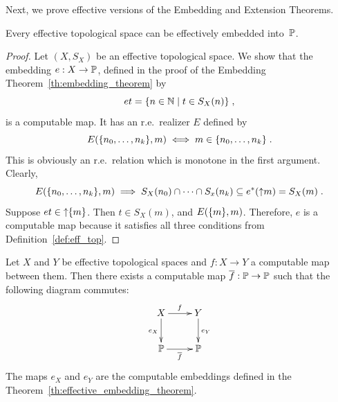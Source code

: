 Next, we prove effective versions of the Embedding and Extension
Theorems.

\begin{theorem}
  \label{th:effective_embedding_theorem}%
  Every effective topological space can be effectively embedded
  into~$\mathbb{P}$.
\end{theorem}

\begin{proof}
  Let $(X, S_X)$ be an effective topological space.  We show that the
  embedding $e: X \to \mathbb{P}$, defined in the proof of the Embedding
  Theorem~\ref{th:embedding_theorem} by
  \begin{equation*}
    e t = \{n \in \mathbb{N} \mid t \in S_X(n)\} \;,
  \end{equation*}
  is a computable map. It has an r.e.~realizer $E$ defined by
  \begin{equation*}
    E(\{n_0, \ldots, n_k\}, m) \iff
    m \in \{n_0, \ldots, n_k\} \;.
  \end{equation*}
  This is obviously an r.e.~relation which is monotone in the first
  argument. Clearly,
  \begin{equation*}
     E(\{n_0, \ldots, n_k\}, m) \implies
     S_X(n_0) \cap \cdots \cap S_x(n_k) \subseteq
     e^{*}({\uparrow}m) = S_X(m) \;.
  \end{equation*}
  Suppose $e t \in {\uparrow}\{m\}$. Then $t \in S_X(m)$, and
  $E(\{m\}, m)$. Therefore, $e$ is a computable map because it
  satisfies all three conditions from Definition~\ref{def:eff_top}.
\end{proof}

\begin{theorem}
  \label{th:effective_extension_theorem}%
  Let $X$ and $Y$ be effective topological spaces and $f: X \to Y$ a 
  computable map between them. Then there exists a computable map
  $\overline{f}: \mathbb{P} \to \mathbb{P}$ such that the following diagram commutes:
  \begin{equation*}
    \xymatrix{
      {X} \ar[r]^{f} \ar[d]_{e_X}  &  {Y} \ar[d]^{e_Y} \\
      {\Scott} \ar[r]_{\overline{f}} & {\Scott} 
    }
  \end{equation*}
  The maps $e_X$ and $e_Y$ are the computable embeddings defined in
  the Theorem~\ref{th:effective_embedding_theorem}.
\end{theorem}

